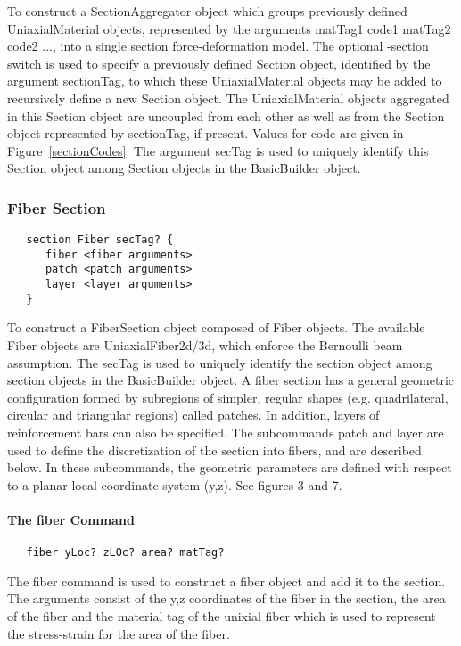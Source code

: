 \documentclass[12pt]{article}
\begin{document}
To construct a SectionAggregator object which groups
previously defined UniaxialMaterial objects, represented by the
arguments matTag1 code1 matTag2 code2 ..., into a single section
force-deformation model. The optional -section switch is used to
specify a previously defined Section object, identified by the
argument sectionTag, to which these UniaxialMaterial objects may be
added to recursively define a new Section object. The UniaxialMaterial
objects aggregated in this Section object are uncoupled from each
other as well as from the Section object represented by sectionTag, if
present. Values for code are given in Figure~\ref{sectionCodes}. The
argument secTag is used to uniquely identify this Section object among
Section objects in the BasicBuilder object. 

\subsubsection{Fiber Section}
{\sf\small
\begin{verbatim}
   section Fiber secTag? {
      fiber <fiber arguments>
      patch <patch arguments>
      layer <layer arguments>
   }
\end{verbatim}
}


\noindent To construct a FiberSection object composed of Fiber objects.
The available Fiber objects are UniaxialFiber2d/3d, which enforce the
Bernoulli beam assumption. The secTag is used to uniquely identify the 
section object among section objects in the BasicBuilder object. A fiber 
section has a general geometric configuration formed by subregions
of simpler, regular shapes (e.g. quadrilateral, circular and triangular
regions) called patches. In addition, layers of reinforcement bars 
can also be specified. The subcommands patch and layer are used to
define the discretization of the section into
fibers, and are described below. In these subcommands, the geometric
parameters are defined with respect to a planar local coordinate system (y,z). 
See figures 3 and 7.

\paragraph{The fiber Command}

{\sf\small
\begin{verbatim}
   fiber yLoc? zLOc? area? matTag?
\end{verbatim}
}

The fiber command is used to construct a fiber object and add it to
the section. The arguments consist of the y,z coordinates of the fiber
in the section, the area of the fiber and the material tag of the
unixial fiber which is used to represent the stress-strain for the
area of the fiber.
\end{document}
